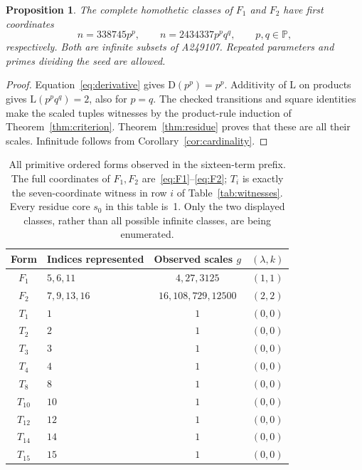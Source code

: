 \documentclass[11pt,a4paper]{article}
\newcommand{\PP}{\mathbb{P}}
\newcommand{\D}{\mathrm{D}}
\newcommand{\Lrate}{\mathrm{L}}
\newtheorem{proposition}[theorem]{Proposition}
\theoremstyle{definition}
\theoremstyle{remark}
\begin{document}
\begin{proposition}\label{prop:families}
The complete homothetic classes of $F_1$ and $F_2$ have first coordinates
\begin{equation}\label{eq:families}
 n=338745p^p,\qquad n=2434337p^pq^q,
 \qquad p,q\in\PP,
\end{equation}
respectively. Both are infinite subsets of A249107. Repeated parameters
and primes dividing the seed are allowed.
\end{proposition}
\begin{proof}
Equation~\eqref{eq:derivative} gives $\D(p^p)=p^p$. Additivity of
$\Lrate$ on products gives $\Lrate(p^pq^q)=2$, also for $p=q$.
The checked transitions and square identities make the scaled tuples
witnesses by the product-rule induction of Theorem~\ref{thm:criterion}.
Theorem~\ref{thm:residue} proves that these are all their scales.
Infinitude follows from Corollary~\ref{cor:cardinality}.
\end{proof}

\begin{table}[htbp]
\centering\small
\begin{tabular}{clcc}
\toprule
Form & Indices represented & Observed scales $g$ & $(\lambda,k)$\\
\midrule
$F_1$ & $5,6,11$ & $4,27,3125$ & $(1,1)$\\
$F_2$ & $7,9,13,16$ & $16,108,729,12500$ & $(2,2)$\\
$T_1$ & $1$ & $1$ & $(0,0)$\\
$T_2$ & $2$ & $1$ & $(0,0)$\\
$T_3$ & $3$ & $1$ & $(0,0)$\\
$T_4$ & $4$ & $1$ & $(0,0)$\\
$T_8$ & $8$ & $1$ & $(0,0)$\\
$T_{10}$ & $10$ & $1$ & $(0,0)$\\
$T_{12}$ & $12$ & $1$ & $(0,0)$\\
$T_{14}$ & $14$ & $1$ & $(0,0)$\\
$T_{15}$ & $15$ & $1$ & $(0,0)$\\
\bottomrule
\end{tabular}
\caption{All primitive ordered forms observed in the sixteen-term prefix.
The full coordinates of $F_1,F_2$ are~\eqref{eq:F1}--\eqref{eq:F2};
$T_i$ is exactly the seven-coordinate witness in row $i$ of
Table~\ref{tab:witnesses}. Every residue core $s_0$ in this table is~1.
Only the two displayed classes, rather than all possible infinite classes,
are being enumerated.}\label{tab:forms}
\end{table}
\end{document}
